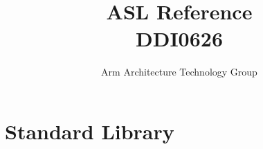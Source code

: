 \documentclass{book}
\author{Arm Architecture Technology Group}
\title{ASL Reference \\
       DDI0626}
\begin{document}
\maketitle

\tableofcontents{}





































\chapter{Standard Library}




\appendix

\end{document}
